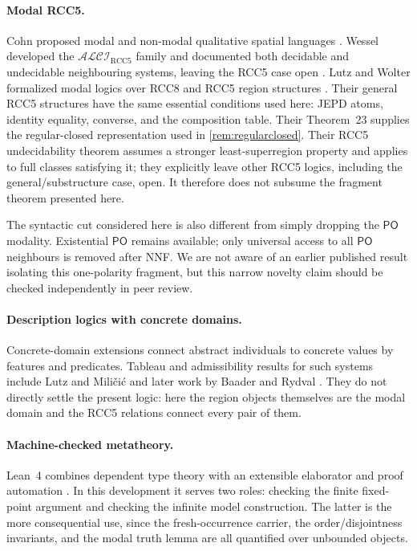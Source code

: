 \documentclass[11pt]{article}
\theoremstyle{plain}
\theoremstyle{definition}
\theoremstyle{remark}
\newcommand{\Logic}{\ensuremath{\mathcal{ALCI}_{\mathrm{RCC5}}}}
\newcommand{\PO}{\ensuremath{\mathsf{PO}}}
\begin{document}
\paragraph{Modal RCC5.}
Cohn proposed modal and non-modal qualitative spatial languages
\cite{Cohn1993}.  Wessel developed the $\Logic$ family and documented both
decidable and undecidable neighbouring systems, leaving the RCC5 case open
\cite{Wessel2003}.  Lutz and Wolter formalized modal logics over RCC8 and RCC5
region structures \cite{LutzWolter2006}.  Their general RCC5 structures have
the same essential conditions used here: JEPD atoms, identity equality,
converse, and the composition table.  Their Theorem~23 supplies the
regular-closed representation used in \cref{rem:regularclosed}.  Their RCC5
undecidability theorem assumes a stronger least-superregion property and
applies to full classes satisfying it; they explicitly leave other RCC5
logics, including the general/substructure case, open.  It therefore does not
subsume the fragment theorem presented here.

The syntactic cut considered here is also different from simply dropping the
$\PO$ modality.  Existential $\PO$ remains available; only universal access to
all $\PO$ neighbours is removed after NNF.  We are not aware of an earlier
published result isolating this one-polarity fragment, but this narrow novelty
claim should be checked independently in peer review.

\paragraph{Description logics with concrete domains.}
Concrete-domain extensions connect abstract individuals to concrete values by
features and predicates.  Tableau and admissibility results for such systems
include Lutz and Mili\v{c}i\'c \cite{LutzMilicic2007} and later work by Baader
and Rydval \cite{BaaderRydval2020}.  They do not directly settle the present
logic: here the region objects themselves are the modal domain and the RCC5
relations connect every pair of them.

\paragraph{Machine-checked metatheory.}
Lean~4 combines dependent type theory with an extensible elaborator and proof
automation \cite{deMouraUllrich2021}.  In this development it serves two
roles: checking the finite fixed-point argument and checking the infinite
model construction.  The latter is the more consequential use, since the
fresh-occurrence carrier, the order/disjointness invariants, and the modal
truth lemma are all quantified over unbounded objects.
\end{document}
